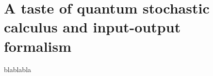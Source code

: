 \chapter{A taste of quantum stochastic calculus and input-output formalism}\label{ann:IOF}
blablabla
